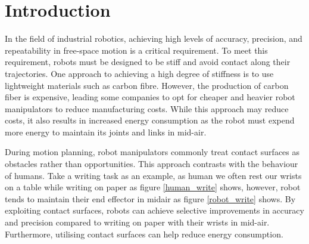 \documentclass[report.tex]{subfiles}
\begin{document}
    \chapter{Introduction}
    In the field of industrial robotics, achieving high levels of accuracy, precision, and repeatability in free-space motion is a critical requirement. To meet this requirement, robots must be designed to be stiff and avoid contact along their trajectories. One approach to achieving a high degree of stiffness is to use lightweight materials such as carbon fibre. However, the production of carbon fiber is expensive, leading some companies to opt for cheaper and heavier robot manipulators to reduce manufacturing costs. While this approach may reduce costs, it also results in increased energy consumption as the robot must expend more energy to maintain its joints and links in mid-air.

    During motion planning, robot manipulators commonly treat contact surfaces as obstacles rather than opportunities. This approach contrasts with the behaviour of humans. Take a writing task as an example, as human we often rest our wrists on a table while writing on paper as figure \ref{human_write} shows, however, robot tends to maintain their end effector in midair as figure \ref{robot_write} shows.  By exploiting contact surfaces, robots can achieve selective improvements in accuracy and precision compared to writing on paper with their wrists in mid-air. Furthermore, utilising contact surfaces can help reduce energy consumption.
    
\end{document}
